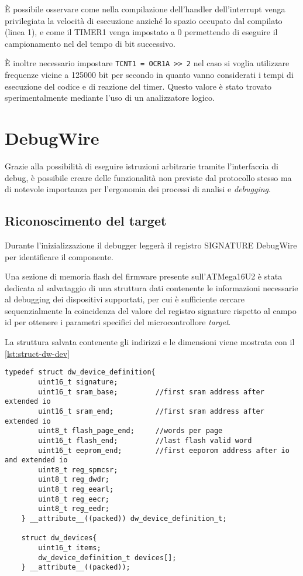 È possibile osservare come nella compilazione dell'handler dell'interrupt venga privilegiata la velocità di esecuzione anziché lo spazio occupato dal compilato (linea 1), e come il TIMER1 venga impostato a 0 permettendo di eseguire il campionamento nel del tempo di bit successivo. 

È inoltre necessario impostare \texttt{TCNT1 = OCR1A >\textcompwordmark> 2} nel caso si voglia utilizzare frequenze vicine a 125000 bit per secondo in quanto vanno considerati i tempi di esecuzione del codice e di reazione del timer. Questo valore è stato trovato sperimentalmente mediante l'uso di un analizzatore logico.

\section{DebugWire}

Grazie alla possibilità di eseguire istruzioni arbitrarie tramite l'interfaccia di debug, è possibile creare delle funzionalità non previste dal protocollo stesso ma di notevole importanza per l'ergonomia dei processi di analisi e \textit{debugging}.

\subsection{Riconoscimento del target}

Durante l'inizializzazione il debugger leggerà il registro SIGNATURE DebugWire per identificare il componente.

Una sezione di memoria flash del firmware presente sull'ATMega16U2 è stata dedicata al salvataggio di una struttura dati contenente le informazioni necessarie al debugging dei dispositivi supportati, per cui è sufficiente cercare sequenzialmente la coincidenza del valore del registro signature rispetto al campo id per ottenere i parametri specifici del microcontrollore \textit{target}.

La struttura salvata contenente gli indirizzi e le dimensioni viene mostrata con il \cref{lst:struct-dw-dev}

\noindent\begin{minipage}{\textwidth}
    \begin{lstlisting}[style=C, caption={Strutture utilizzate nel codice finale per il salvataggio e la ricerca dei parametri associati al target connesso}, label=lst:struct-dw-dev]
    typedef struct dw_device_definition{
        uint16_t signature;
        uint16_t sram_base;         //first sram address after extended io
        uint16_t sram_end;          //first sram address after extended io
        uint8_t flash_page_end;     //words per page
        uint16_t flash_end;         //last flash valid word
        uint16_t eeprom_end;        //first eeporom address after io and extended io
        uint8_t reg_spmcsr;
        uint8_t reg_dwdr;
        uint8_t reg_eearl;
        uint8_t reg_eecr;
        uint8_t reg_eedr;
    } __attribute__((packed)) dw_device_definition_t;

    struct dw_devices{
        uint16_t items;
        dw_device_definition_t devices[];
    } __attribute__((packed));
    \end{lstlisting}
\end{minipage}


